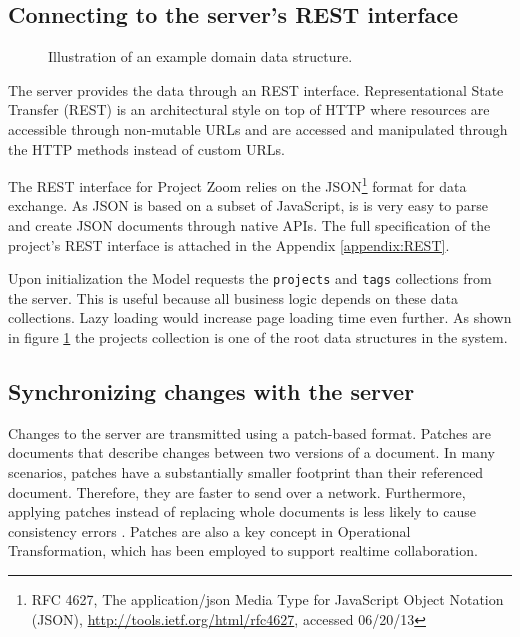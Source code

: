 \subsection{Connecting to the server's REST interface}

\begin{figure}
\caption{Illustration of an example domain data structure.}
\label{fig:projectstruc}
\end{figure}

The server provides the data through an REST interface. Representational State Transfer (REST) is an architectural style on top of HTTP where resources are accessible through non-mutable URLs and are accessed and manipulated through the HTTP methods instead of custom URLs. \cite{Fielding_2000} 

The REST interface for Project Zoom relies on the JSON\footnote{RFC 4627,  The application/json Media Type for JavaScript Object Notation (JSON), \url{http://tools.ietf.org/html/rfc4627}, accessed 06/20/13} format for data exchange. As JSON is based on a subset of JavaScript, is is very easy to parse and create JSON documents through native APIs. The full specification of the project's REST interface is attached in the Appendix \ref{appendix:REST}.

Upon initialization the Model requests the \texttt{projects} and \texttt{tags} collections from the server. This is useful because all business logic depends on these data collections. Lazy loading would increase page loading time even further. As shown in figure \ref{fig:projectstruc} the projects collection is one of the root data structures in the system. %


\subsection{Synchronizing changes with the server}

Changes to the server are transmitted using a patch-based format. Patches are documents that describe changes between two versions of a document. In many scenarios, patches have a substantially smaller footprint than their referenced document. Therefore, they are faster to send over a network. Furthermore, applying patches instead of replacing whole documents is less likely to cause consistency errors \cite{Ellis_1989}. Patches are also a key concept in Operational Transformation, which has been employed to support realtime collaboration.

